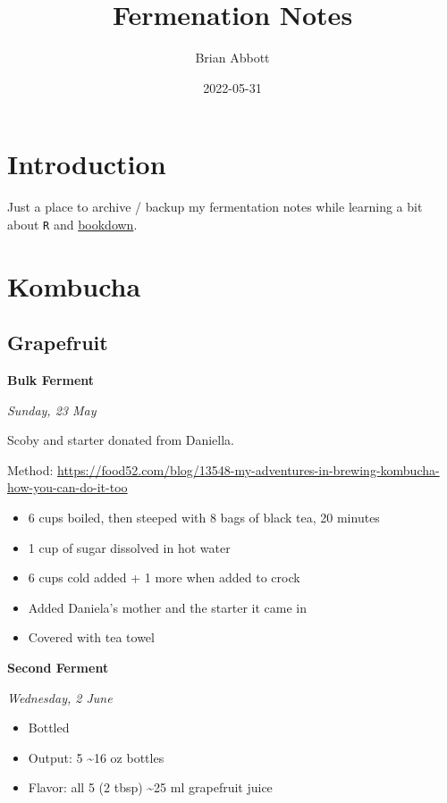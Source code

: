 \documentclass[
]{book}
\title{Fermenation Notes}
\author{Brian Abbott}
\date{2022-05-31}
\providecommand{\tightlist}{%
  \setlength{\itemsep}{0pt}\setlength{\parskip}{0pt}}
\begin{document}
\maketitle

{
\setcounter{tocdepth}{1}
\tableofcontents
}
\hypertarget{introduction}{%
\chapter{Introduction}\label{introduction}}

Just a place to archive / backup my fermentation notes while learning a bit about \texttt{R} and \href{https://bookdown.org/}{bookdown}.

\hypertarget{kombucha}{%
\chapter{Kombucha}\label{kombucha}}

\hypertarget{grapefruit}{%
\section{Grapefruit}\label{grapefruit}}

\textbf{Bulk Ferment}

\emph{Sunday, 23 May}

Scoby and starter donated from Daniella.

Method: \url{https://food52.com/blog/13548-my-adventures-in-brewing-kombucha-how-you-can-do-it-too}

\begin{itemize}
\item
  6 cups boiled, then steeped with 8 bags of black tea, 20 minutes
\item
  1 cup of sugar dissolved in hot water
\item
  6 cups cold added + 1 more when added to crock
\item
  Added Daniela's mother and the starter it came in
\item
  Covered with tea towel
\end{itemize}

\textbf{Second Ferment}

\emph{Wednesday, 2 June}

\begin{itemize}
\tightlist
\item
  Bottled
\item
  Output: 5 \textasciitilde16 oz bottles
\item
  Flavor: all 5 (2 tbsp) \textasciitilde25 ml grapefruit juice
\end{itemize}
\end{document}
